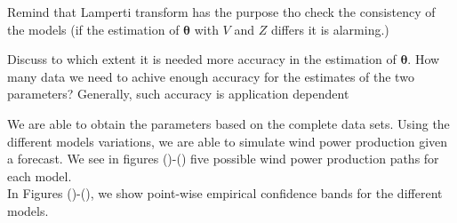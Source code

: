 \documentclass[11pt]{article}
\theoremstyle{definition}
\begin{document}
{\color{red} Remind that Lamperti transform has the purpose tho check the consistency of the models (if the estimation of $\bm{\theta}$ with $V$ and $Z$ differs it is alarming.)}

{\color{red} Discuss to which extent it is needed more accuracy in the estimation of $\bm{\theta}$. How many data we need to achive enough accuracy for the estimates of the two parameters? Generally, such accuracy is application dependent}

 We are able to obtain the parameters based on the complete data sets. Using the different models variations, we are able to simulate wind power production given a forecast. We see in figures ()-()
five possible wind power production paths for each model.\\

In Figures ()-(), we show point-wise empirical confidence bands for the different models.
\end{document}
